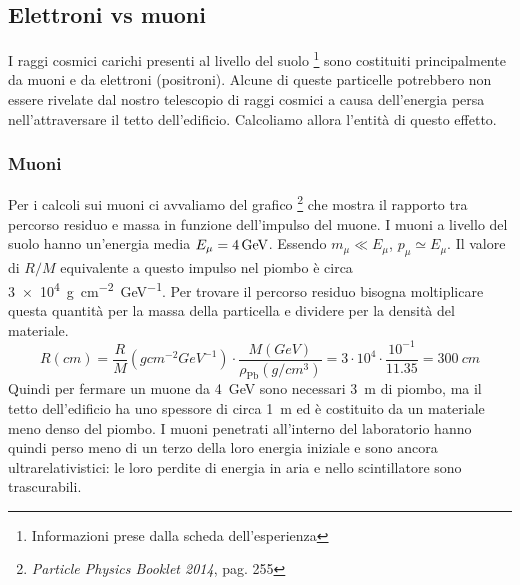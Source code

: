 \subsection{Elettroni vs muoni}  %

I raggi cosmici carichi presenti al livello del suolo%
\footnote{Informazioni prese dalla scheda dell'esperienza}
sono costituiti principalmente da muoni e da elettroni (positroni). Alcune di queste particelle potrebbero non essere rivelate dal nostro telescopio di raggi cosmici a causa dell'energia persa nell'attraversare il tetto dell'edificio. Calcoliamo allora l'entità di questo effetto.
\subsubsection{Muoni} 
Per i calcoli sui muoni ci avvaliamo del grafico%
\footnote{\emph{Particle Physics Booklet 2014}, pag. 255}
che mostra il rapporto tra percorso residuo e massa in funzione dell'impulso del muone.
I muoni a livello del suolo hanno un'energia media $E_\mu=\SI4{GeV}$. Essendo $m_\mu \ll E_\mu$, $p_\mu \simeq E_\mu$. Il valore di $R/M$ equivalente a questo impulso nel piombo è circa \SI{3e4}{g cm^{-2} GeV^{-1}}. Per trovare il percorso residuo bisogna moltiplicare questa quantità per la massa della particella e dividere per la densità del materiale.
\begin{equation}
R(\si{cm})=\frac{R}{M} (\si{g cm^{-2} GeV^{-1}}) \cdot \frac{M(\si{GeV})}{\rho_{\text{Pb}} (\si{g/cm^3})}=3\cdot10^4 \cdot  \frac{10^{-1} }{11.35}=\SI{300}{cm}    
\end{equation}
Quindi per fermare un muone da \SI{4}{GeV} sono necessari \SI{3}{m} di piombo, ma il tetto dell'edificio ha uno spessore di circa \SI{1}{m}
 ed è costituito da un materiale meno denso del piombo. I muoni penetrati all'interno del laboratorio hanno quindi perso meno di un terzo della loro energia iniziale e sono ancora ultrarelativistici: le loro perdite di energia in aria e nello scintillatore sono trascurabili. 

